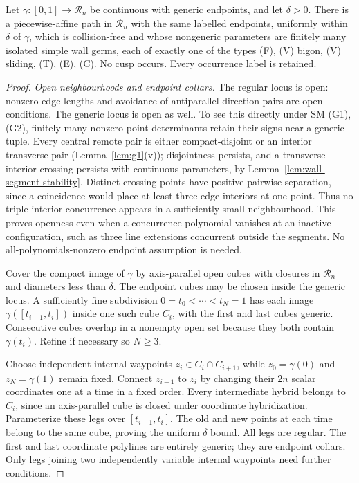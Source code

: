 \begin{theorem}
\label{thm:relgp}\leanok
Let $\gamma:[0,1]\to\mathcal R_n$ be continuous with generic endpoints,
and let $\delta>0$. There is a piecewise-affine path in $\mathcal R_n$ with
the same labelled endpoints, uniformly within $\delta$ of $\gamma$, which
is collision-free and whose nongeneric parameters are finitely many isolated
simple wall germs, each of exactly one of the types (F), (V) bigon, (V)
sliding, (T), (E), (C). No cusp occurs. Every occurrence label is retained.

\end{theorem}
\begin{proof}\leanok{}
\emph{Open neighbourhoods and endpoint collars.}
The regular locus is open: nonzero edge lengths and avoidance of antiparallel
direction pairs are open conditions. The generic locus is open as well.
To see this directly under SM (G1),(G2), finitely many nonzero point determinants
retain their signs near a generic tuple. Every central remote pair is either
compact-disjoint or an interior transverse pair (Lemma~\ref{lem:g1}(v));
disjointness persists, and a transverse interior crossing persists with
continuous parameters, by Lemma~\ref{lem:wall-segment-stability}. Distinct crossing points have positive pairwise separation, since
a coincidence would place at least three edge interiors at one point. Thus
no triple interior concurrence appears in a sufficiently small neighbourhood.
This proves openness even when a concurrence polynomial vanishes at an
inactive configuration, such as three line extensions concurrent outside the
segments. No all-polynomials-nonzero endpoint assumption is needed.

Cover the compact image of $\gamma$ by axis-parallel open cubes with closures
in $\mathcal R_n$ and diameters less than $\delta$. The endpoint cubes may
be chosen inside the generic locus. A sufficiently fine subdivision
$0=t_0<\cdots<t_N=1$ has each image
$\gamma([t_{i-1},t_i])$ inside one such cube $C_i$, with the first and last
cubes generic. Consecutive cubes overlap in a nonempty open set because they
both contain $\gamma(t_i)$. Refine if necessary so $N\geq3$.

Choose independent internal waypoints $z_i\in C_i\cap C_{i+1}$, while
$z_0=\gamma(0)$ and $z_N=\gamma(1)$ remain fixed. Connect $z_{i-1}$ to $z_i$
by changing their $2n$ scalar coordinates one at a time in a fixed order.
Every intermediate hybrid belongs to $C_i$, since an axis-parallel cube is
closed under coordinate hybridization. Parameterize these legs over
$[t_{i-1},t_i]$. The old and new points at each time belong to the same
cube, proving the uniform $\delta$ bound. All legs are regular. The first
and last coordinate polylines are entirely generic; they are endpoint collars.
Only legs joining two independently variable internal waypoints need further
conditions.


\end{proof}
